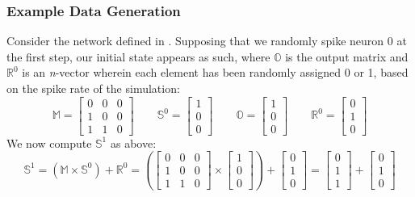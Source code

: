 \subsubsection{Example Data Generation}
Consider the network defined in . Supposing that we randomly 
spike neuron 0 at the first step, our initial state appears as such, where 
$\mathbb{O}$ is the output matrix and $\mathbb{R}^0$ is an \textit{n}-vector 
wherein each element has been randomly assigned 0 or 1, based on the spike rate 
of the simulation:
\[
	\mathbb{M} = \begin{bmatrix}
		0 & 0 & 0 \\
		1 & 0 & 0 \\
		1 & 1 & 0
	\end{bmatrix} \qquad
	\mathbb{S}^0 = \begin{bmatrix} 1 \\ 0 \\ 0 \end{bmatrix} \qquad
	\mathbb{O} = \begin{bmatrix} 1 \\ 0 \\ 0 \end{bmatrix} \qquad
	\mathbb{R}^0 = \begin{bmatrix} 0 \\ 1 \\ 0 \end{bmatrix}
\]
We now compute $\mathbb{S}^1$ as above:
\begin{equation}
	\mathbb{S}^1 = (\mathbb{M} \times \mathbb{S}^0) + \mathbb{R}^0 = 
	\left(\begin{bmatrix}
		0 & 0 & 0 \\
		1 & 0 & 0 \\
		1 & 1 & 0
	\end{bmatrix} \times \begin{bmatrix} 1 \\ 0 \\ 0 \end{bmatrix}\right)
	+ \begin{bmatrix} 0 \\ 1 \\ 0 \end{bmatrix}
	= \begin{bmatrix} 0 \\ 1 \\ 1 \end{bmatrix} + \begin{bmatrix} 0 \\ 1 \\ 0 
\end{bmatrix}
\end{equation}
